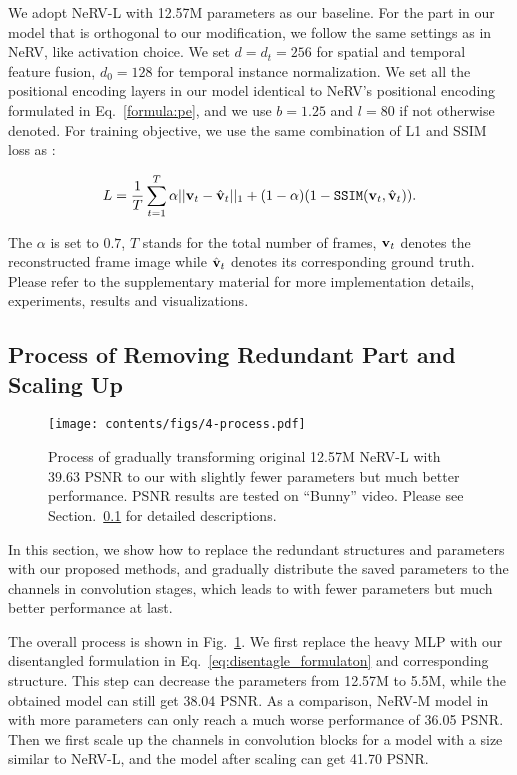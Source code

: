 \documentclass[runningheads]{llncs}
\begin{document}
We adopt NeRV-L with 12.57M parameters as our baseline. For the part in our model that is orthogonal to our modification, we follow the same settings as in NeRV, like activation choice. We set $d=d_t=256$ for spatial and temporal feature fusion, $d_0=128$ for temporal instance normalization. We set all the positional encoding layers in our model identical to NeRV's positional encoding formulated in Eq.~\ref{formula:pe}, and we use $b=1.25$ and $l=80$ if not otherwise denoted. For training objective, we use the same combination of L1 and SSIM loss as \cite{chen2021nerv}:

\begin{equation}
    L = \frac{1}{T}\sum_{t=1}^T \alpha ||\mathbf{v}_t-\hat{\mathbf{v}}_t||_1 + (1-\alpha)(1-\texttt{SSIM}(\mathbf{v}_t, \hat{\mathbf{v}}_t)).
\end{equation}

The $\alpha$ is set to $0.7$, $T$ stands for the total number of frames, $\mathbf{v}_t$ denotes the reconstructed frame image while $\hat{\mathbf{v}}_t$ denotes its corresponding ground truth. Please refer to the supplementary material for more implementation details, experiments, results and visualizations.



\subsection{Process of Removing Redundant Part and Scaling Up}
\label{exp-process}

\begin{figure}[t]
    \centering
    \texttt{[image: contents/figs/4-process.pdf]}
    \caption{Process of gradually transforming original 12.57M NeRV-L with 39.63 PSNR to our \netname with slightly fewer parameters but much better performance. PSNR results are tested on ``Bunny'' video. Please see Section.~\ref{exp-process} for detailed descriptions.}
    \label{fig:exp-parameters-process}
    
\end{figure}

In this section, we show how to replace the redundant structures and parameters with our proposed methods, and gradually distribute the saved parameters to the channels in convolution stages, which leads to \netname with fewer parameters but much better performance at last.

The overall process is shown in Fig.~\ref{fig:exp-parameters-process}. We first replace the heavy MLP with our disentangled formulation in Eq.~\ref{eq:disentagle_formulaton} and corresponding structure. This step can decrease the parameters from 12.57M to 5.5M, while the obtained model can still get 38.04 PSNR. As a comparison, NeRV-M model in \cite{chen2021nerv} with more parameters can only reach a much worse performance of 36.05 PSNR. Then we first scale up the channels in convolution blocks for a model with a size similar to NeRV-L, and the model after scaling can get 41.70 PSNR.
\end{document}
